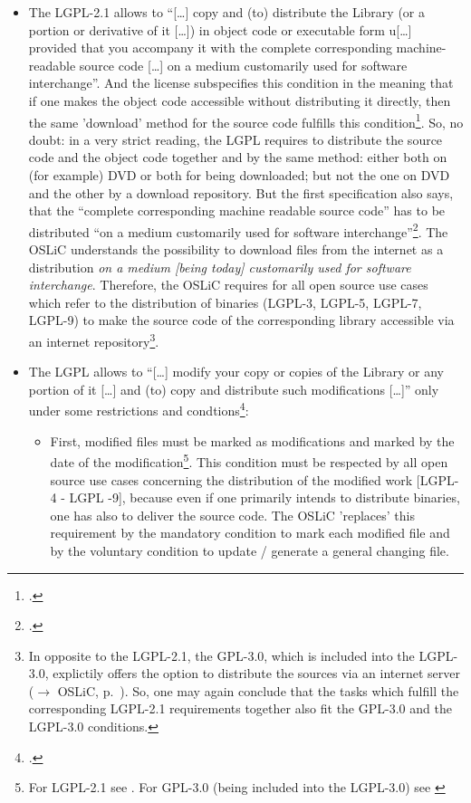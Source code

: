 \begin{itemize}
  \item The LGPL-2.1 allows to \enquote{[\ldots] copy and (to) distribute the
  Library (or a portion or derivative of it [\ldots]) in object code or
  executable form u[\ldots] provided that you accompany it with the complete
  corresponding machine-readable source code [\ldots] on a medium customarily
  used for software interchange}. And the license subspecifies this condition in
  the meaning that if one makes the object code accessible without distributing
  it directly, then the same 'download' method for the source code fulfills this
  condition\footcite[cf.][\nopage wp.\ §4]{Lgpl21OsiLicense1999a}. So, no doubt:
  in a very strict reading, the LGPL requires to distribute the source code and
  the object code together and by the same method: either both on (for example)
  DVD or both for being downloaded; but not the one on DVD and the other by a
  download repository. But the first specification also says, that the
  \enquote{complete corresponding machine readable source code} has to be
  distributed \enquote{on a medium customarily used for software
  interchange}\footcite[cf.][\nopage wp.\ §4]{Lgpl21OsiLicense1999a}. The OSLiC
  understands the possibility to download files from the internet as a
  distribution \emph{on a medium [being today] customarily used for software
  interchange}. Therefore, the OSLiC requires for all open source use cases
  which refer to the distribution of binaries (LGPL-3, LGPL-5, LGPL-7, LGPL-9)
  to make the source code of the corresponding library accessible via an
  internet repository\footnote{In opposite to the LGPL-2.1, the GPL-3.0, which
  is included into the LGPL-3.0, explictily offers the option to distribute the
  sources via an internet server ($\rightarrow$ OSLiC, p.\
  \pageref{Gpl3CondCopyleft}). So, one may again conclude that the tasks
  which fulfill the corresponding LGPL-2.1 requirements together also fit the
  GPL-3.0 and the LGPL-3.0 conditions.}.
  
  \item The LGPL allows to \enquote{[\ldots] modify your copy or copies of
  the Library or any portion of it [\ldots] and (to) copy and distribute such
  modifications [\ldots]} only under some restrictions and
  condtions\footcite[cf.][\nopage wp.\ §2]{Lgpl21OsiLicense1999a}:
  \begin{itemize}
    \item First, modified files must be marked as modifications and marked by
    the date of the modification\footnote{For LGPL-2.1 see \cite[cf.][\nopage
    wp.\ §2]{Lgpl21OsiLicense1999a}. For GPL-3.0 (being included into the
    LGPL-3.0) see \cite[cf.][\nopage wp.\ §5]{Gpl30OsiLicense2007a}}. This
    condition must be respected by all open source use cases concerning the
    distribution of the modified work [LGPL-4 - LGPL -9], because even if one
    primarily intends to distribute binaries, one has also to deliver the source
    code. The OSLiC 'replaces' this requirement by the mandatory condition to
    mark each modified file and by the voluntary condition to update / generate
    a general changing file.
    

\end{itemize}
\end{itemize}
